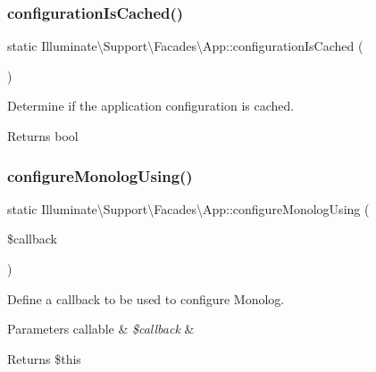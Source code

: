 \subsubsection{\texorpdfstring{configuration\+Is\+Cached()}{configurationIsCached()}}
{\footnotesize\ttfamily static Illuminate\textbackslash{}\+Support\textbackslash{}\+Facades\textbackslash{}\+App\+::configuration\+Is\+Cached (\begin{DoxyParamCaption}{ }\end{DoxyParamCaption})\hspace{0.3cm}{\ttfamily [static]}}

Determine if the application configuration is cached.

\begin{DoxyReturn}{Returns}
bool 
\end{DoxyReturn}
\mbox{\label{class_illuminate_1_1_support_1_1_facades_1_1_app_aeba7c2058e2b423b7f5ed5a49e69c669}} 
\subsubsection{\texorpdfstring{configure\+Monolog\+Using()}{configureMonologUsing()}}
{\footnotesize\ttfamily static Illuminate\textbackslash{}\+Support\textbackslash{}\+Facades\textbackslash{}\+App\+::configure\+Monolog\+Using (\begin{DoxyParamCaption}\item[{}]{\$callback }\end{DoxyParamCaption})\hspace{0.3cm}{\ttfamily [static]}}

Define a callback to be used to configure Monolog.


\begin{DoxyParams}[1]{Parameters}
callable & {\em \$callback} & \\
\hline
\end{DoxyParams}
\begin{DoxyReturn}{Returns}
\$this 
\end{DoxyReturn}
\mbox{\label{class_illuminate_1_1_support_1_1_facades_1_1_app_a6c5c735e7b038aec0a621faea3f5ce71}} 
